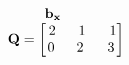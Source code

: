 \documentclass[preview]{standalone}
\begin{document}
\begin{align*}
\begin{array}{ccc}\begin{matrix}\hspace{0.75cm} \mathbf{b_{x}} &  \hspace{0.35cm} &   \hspace{0.35cm} \end{matrix} \\ \mathbf{Q} = \begin{bmatrix} 2 & \hspace{0.1cm} 1 \hspace{0.1cm}& \hspace{0.1cm} 1 \\ \hspace{0.04cm}  0 \hspace{0.1cm} & \hspace{0.1cm} 2 \hspace{0.1cm}\hspace{0.1cm} & 3 \end{bmatrix} \end{array}
\end{align*}
\end{document}

